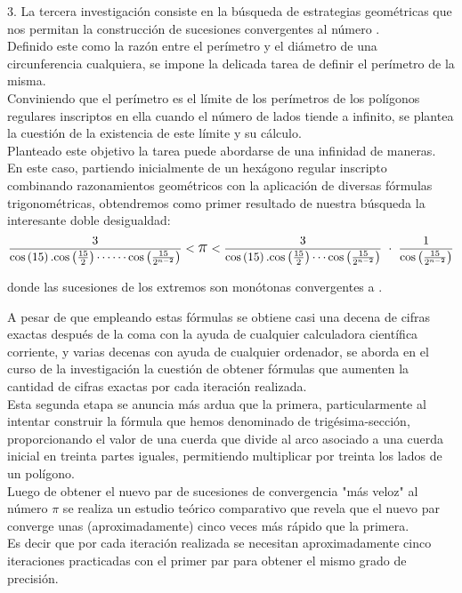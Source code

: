 \documentclass[12pt]{article}
\begin{document}
3. La tercera investigación consiste en la búsqueda de estrategias geométricas que nos permitan la construcción de sucesiones convergentes al número \text{\Large $ \pi $}. \\
Definido este como la razón entre el perímetro y el diámetro de una circunferencia cualquiera, se impone la delicada tarea de definir el perímetro de la misma. \\
Conviniendo que el perímetro es el límite de los perímetros de los polígonos regulares inscriptos en ella cuando el número de lados tiende a infinito, se plantea la cuestión de la existencia de este límite y su cálculo. \\
Planteado este objetivo la tarea puede abordarse de una infinidad de maneras. \\
En este caso, partiendo inicialmente de un hexágono regular inscripto combinando razonamientos geométricos con la aplicación de diversas fórmulas trigonométricas, obtendremos como primer resultado de nuestra búsqueda la interesante doble desigualdad:
$$
  \frac{3}{\mathrm{\cos}\left(15\right).\mathrm{\cos}\left(\frac{15}{2}\right)\cdots\cdots\mathrm{\cos}\left(\frac{15}{{2}^{n-2}}\right)}
  < \text{\Large $ \pi $} <
  \frac{3}{\mathrm{\cos}\left(15\right).\mathrm{\cos}\left(\frac{15}{2}\right)\cdots\mathrm{\cos}\left(\frac{15}{{2}^{n-2}}\right)} \ \cdot \ \frac{1}{\mathrm{\cos}\left(\frac{15}{{2}^{n-2}}\right)}
$$

donde las sucesiones de los extremos son monótonas convergentes a \text{\Large$\pi$}.
\clearpage

A pesar de que empleando estas fórmulas se obtiene casi una decena de cifras exactas después de la coma con la ayuda de cualquier calculadora científica corriente, y varias decenas con ayuda de cualquier ordenador, se aborda en el curso de la investigación la cuestión de obtener fórmulas que aumenten la cantidad de cifras exactas por cada iteración realizada. \\
Esta segunda etapa se anuncia más ardua que la primera, particularmente al intentar construir la fórmula que hemos denominado de trigésima-sección, proporcionando el valor de una cuerda que divide al arco asociado a una cuerda inicial en treinta partes iguales, permitiendo multiplicar por treinta los lados de un polígono. \\
Luego de obtener el nuevo par de sucesiones de convergencia "más veloz" al número $\pi$ se realiza un estudio teórico comparativo que revela que el nuevo par converge unas (aproximadamente) cinco veces más rápido que la primera. \\
Es decir que por cada iteración realizada se necesitan aproximadamente cinco iteraciones practicadas con el primer par para obtener el mismo grado de precisión.
\end{document}
